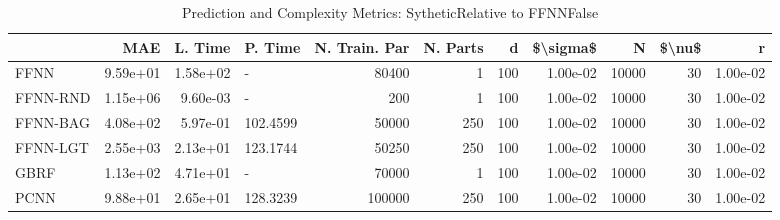 \begin{table}
\centering
\caption{Prediction and Complexity Metrics: SytheticRelative to FFNNFalse}
\label{tab__Sythetic__Fix_Neurons_QTrue}
\begin{tabular}{lrrlrrrrrrr}
\toprule
{} &      MAE &  L. Time &   P. Time &  N. Train. Par &  N. Parts &    d &  \$\textbackslash sigma\$ &      N &  \$\textbackslash nu\$ &        r \\
\midrule
FFNN     & 9.59e+01 & 1.58e+02 &         - &          80400 &         1 &  100 &  1.00e-02 &  10000 &     30 & 1.00e-02 \\
FFNN-RND & 1.15e+06 & 9.60e-03 &         - &            200 &         1 &  100 &  1.00e-02 &  10000 &     30 & 1.00e-02 \\
FFNN-BAG & 4.08e+02 & 5.97e-01 &  102.4599 &          50000 &       250 &  100 &  1.00e-02 &  10000 &     30 & 1.00e-02 \\
FFNN-LGT & 2.55e+03 & 2.13e+01 &  123.1744 &          50250 &       250 &  100 &  1.00e-02 &  10000 &     30 & 1.00e-02 \\
GBRF     & 1.13e+02 & 4.71e+01 &         - &          70000 &         1 &  100 &  1.00e-02 &  10000 &     30 & 1.00e-02 \\
PCNN     & 9.88e+01 & 2.65e+01 &  128.3239 &         100000 &       250 &  100 &  1.00e-02 &  10000 &     30 & 1.00e-02 \\
\bottomrule
\end{tabular}
\end{table}
